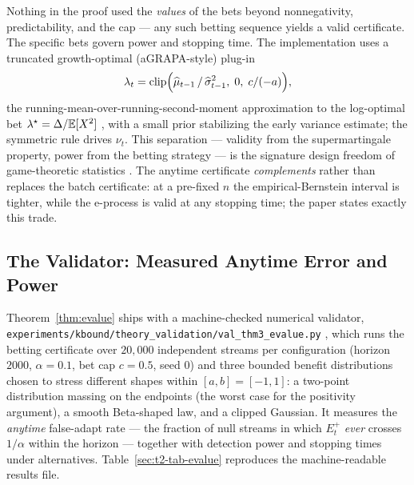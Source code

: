 \begin{remark}
\label{sec:t2-rem-bets}
Nothing in the proof used the \emph{values} of the bets beyond nonnegativity,
predictability, and the cap --- any such betting sequence yields a valid certificate.
The specific bets govern power and stopping time. The implementation uses a truncated
growth-optimal (aGRAPA-style) plug-in
\[
\lambda_t=\mathrm{clip}\Bigl(\widehat\mu_{t-1}\,/\,\widehat\sigma^2_{t-1},\;0,\;c/(-a)\Bigr),
\]
the running-mean-over-running-second-moment approximation to the log-optimal bet
$\lambda^\star=\Delta/\mathbb{E}[X^2]$ \cite{waudbysmith2024betting}, with a small prior
stabilizing the early variance estimate; the symmetric rule drives $\nu_t$. This
separation --- validity from the supermartingale property, power from the betting
strategy --- is the signature design freedom of game-theoretic statistics
\cite{shafer2019game,ramdas2023gametheoretic}. The anytime certificate
\emph{complements} rather than replaces the batch certificate: at a pre-fixed $n$ the
empirical-Bernstein interval is tighter, while the e-process is valid at any stopping
time; the paper states exactly this trade.
\end{remark}

\subsection{The Validator: Measured Anytime Error and Power}
\label{sec:t2-evalue-validation}

Theorem~\ref{thm:evalue} ships with a machine-checked numerical validator,
\texttt{experiments/kbound/theory\_validation/val\_thm3\_evalue.py}
\cite{kbound2026repo}, which runs the betting certificate over $20{,}000$ independent
streams per configuration (horizon $2000$, $\alpha=0.1$, bet cap $c=0.5$, seed $0$) and
three bounded benefit distributions chosen to stress different shapes within
$[a,b]=[-1,1]$: a two-point distribution massing on the endpoints (the worst case for
the positivity argument), a smooth Beta-shaped law, and a clipped Gaussian. It measures
the \emph{anytime} false-adapt rate --- the fraction of null streams in which $E^+_t$
\emph{ever} crosses $1/\alpha$ within the horizon --- together with detection power and
stopping times under alternatives. Table~\ref{sec:t2-tab-evalue} reproduces the
machine-readable results file.

